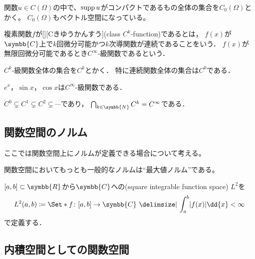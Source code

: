 \documentclass[../sotsu.tex]{subfiles}
\begin{document}
関数$u \in C(\Omega)$の中で、$\operatorname{supp} u$がコンパクトであるもの全体の集合を$C_0 (\Omega)$とかく。
$C_0 (\Omega)$もベクトル空間になっている。


\begin{definition}
    \label{dfn:class-C^k-function}
    複素関数$f$が[][Cきゆうかんすう](class $C^k$-function)であるとは，
    $f(x)$が$\symbb{C}$上で$k$回微分可能かつ$k$次導関数が連続であることをいう．
    $f(x)$が無限回微分可能であるとき$C^\infty$-級関数であるという．

    $C^k$-級関数全体の集合を$C^k$とかく．
    特に連続関数全体の集合は$C^0$である．
\end{definition}

\begin{example}
    $e^x$，$\sin x$，$\cos x$は$C^\infty$-級関数である．
\end{example}

\begin{example}
    $C^0 \subsetneq C^1 \subsetneq C^2 \subsetneq \dotsb$であり，
    $\bigcap_{k \in \symbb{N}} C^k = C^\infty$である．
\end{example}



\subsection{関数空間のノルム}

ここでは関数空間上にノルムが定義できる場合について考える。

関数空間においてもっとも一般的なノルムは``最大値ノルム''である。

\begin{definition}
    \label{dfn:square-integrable-function-space}
    $[a, b] \subset \symbb{R}$から$\symbb{C}$への(square integrable function space) $L^2$を
    \begin{equation*}
        L^2 (a, b) \coloneq \Set*{ f \colon [a, b] \to \symbb{C}  \given  \int_a^b \abs{f(x)} \dd{x} < \infty }
    \end{equation*}
    で定義する．
\end{definition}





\subsection{内積空間としての関数空間}
\end{document}
